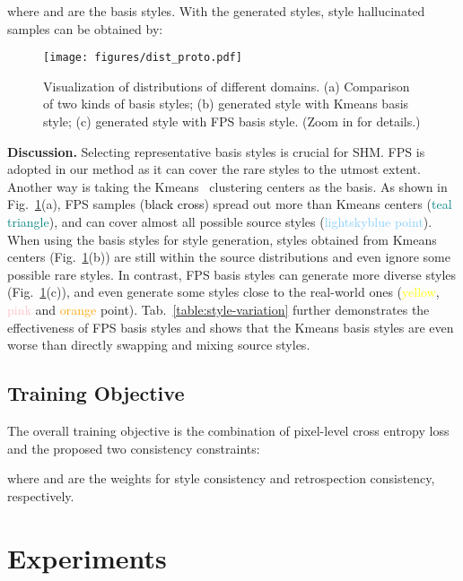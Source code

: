 \documentclass[runningheads]{llncs}
\begin{document}
where  and  are the  basis styles. With the generated styles, style hallucinated samples  can be obtained by:


\begin{figure}[t]
    \centering
    \texttt{[image: figures/dist\_proto.pdf]}
\caption{Visualization of distributions of different domains. (a) Comparison of two kinds of basis styles; (b) generated style with Kmeans basis style; (c) generated style with FPS basis style. (Zoom in for details.) }
    \label{fig:visual-dist}
\end{figure}

\noindent\textbf{Discussion.}
Selecting representative basis styles is crucial for SHM. FPS is adopted in our method as it can cover the rare styles to the utmost extent. Another way is taking the Kmeans~\cite{macqueen1967some_kmeans} clustering centers as the basis. As shown in Fig.~\ref{fig:visual-dist}(a), FPS samples (\textcolor{black}{black cross}) spread out more than Kmeans centers (\textcolor{teal}{teal triangle}), and can cover almost all possible source styles (\textcolor{lightskyblue}{lightskyblue point}). When using the basis styles for style generation, styles obtained from Kmeans centers (Fig.~\ref{fig:visual-dist}(b)) are still within the source distributions and even ignore some possible rare styles. In contrast, FPS basis styles can generate more diverse styles (Fig.~\ref{fig:visual-dist}(c)), and even generate some styles close to the real-world ones (\textcolor{yellow}{yellow}, \textcolor{pink}{pink} and \textcolor{orange}{orange} point). Tab.~\ref{table:style-variation} further demonstrates the effectiveness of FPS basis styles and shows that the Kmeans basis styles are even worse than directly swapping and mixing source styles.


\subsection{Training Objective}
The overall training objective is the combination of pixel-level cross entropy loss and the proposed two consistency constraints:

where  and  are the weights for style consistency and retrospection consistency, respectively.



\section{Experiments}
\end{document}
